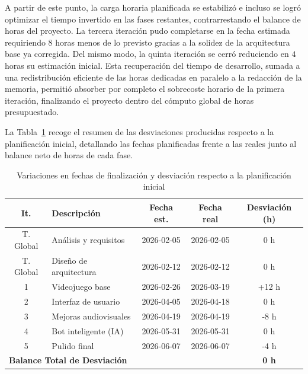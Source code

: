 A partir de este punto, la carga horaria planificada se estabilizó e incluso se logró optimizar el tiempo invertido en las fases restantes, contrarrestando el balance de horas del proyecto. La tercera iteración pudo completarse en la fecha estimada requiriendo $8$ horas menos de lo previsto gracias a la solidez de la arquitectura base ya corregida. Del mismo modo, la quinta iteración se cerró reduciendo en $4$ horas su estimación inicial. Esta recuperación del tiempo de desarrollo, sumada a una redistribución eficiente de las horas dedicadas en paralelo a la redacción de la memoria, permitió absorber por completo el sobrecoste horario de la primera iteración, finalizando el proyecto dentro del cómputo global de horas presupuestado.

La Tabla~\ref{tab:variacion} recoge el resumen de las desviaciones producidas respecto a la planificación inicial, detallando las fechas planificadas frente a las reales junto al balance neto de horas de cada fase.

\begin{table}[H]
	\centering
	\begin{tabular}{|c|p{}|c|c|c|}
		\hline
		\textbf{It.} & \textbf{Descripción} & \textbf{Fecha est.} & \textbf{Fecha real} & \textbf{Desviación (h)} \\
		\hline
		T. Global & Análisis y requisitos & 2026-02-05 & 2026-02-05 & 0 h \\
		\hline
		T. Global & Diseño de arquitectura & 2026-02-12 & 2026-02-12 & 0 h \\
		\hline
		1 & Videojuego base & 2026-02-26 & 2026-03-19 & +12 h \\
		\hline
		2 & Interfaz de usuario & 2026-04-05 & 2026-04-18 & 0 h \\
		\hline
		3 & Mejoras audiovisuales & 2026-04-19 & 2026-04-19 & -8 h \\
		\hline
		4 & Bot inteligente (IA) & 2026-05-31 & 2026-05-31 & 0 h \\
		\hline
		5 & Pulido final & 2026-06-07 & 2026-06-07 & -4 h \\
		\hline
		\multicolumn{2}{|l|}{\textbf{Balance Total de Desviación}} & \multicolumn{2}{c|}{} & \textbf{0 h} \\
		\hline
	\end{tabular}
	\caption{Variaciones en fechas de finalización y desviación respecto a la planificación inicial}
	\label{tab:variacion}
\end{table}

\clearpage

